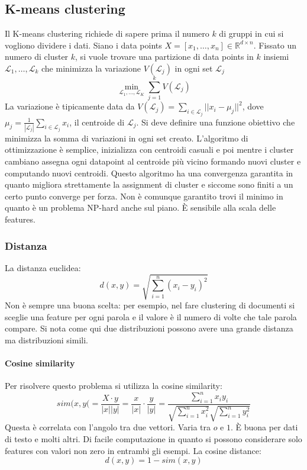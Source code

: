 	\subsection{K-means clustering}
	Il K-means clustering richiede di sapere prima il numero $k$ di gruppi in cui si vogliono dividere i dati.
	Siano i data points $X=[x_1,\dots,x_n]\in\mathbb{R}^{d\times n}$.
	Fissato un numero di cluster $k$, si vuole trovare una partizione di data points in $k$ insiemi $\mathcal{L}_1,\dots,\mathcal{L}_k$ che minimizza la variazione $V(\mathcal{L}_j)$ in ogni set $\mathcal{L}_j$
	$$\min\limits_{\mathcal{L}_1,\dots,\mathcal{L}_K}\sum\limits_{j = 1}^kV(\mathcal{L}_j)$$
	La variazione \`e tipicamente data da $V(\mathcal{L}_j) = \sum\limits_{i\in\mathcal{L}_j}||x_i-\mu_j||^2$, dove $\mu_j = \frac{1}{|\mathcal{L}_j|}\sum\limits_{i\in\mathcal{L}_j}x_i$, il centroide di $\mathcal{L}_j$.
	Si deve definire una funzione obiettivo che minimizza la somma di variazioni in ogni set creato.
	L'algoritmo di ottimizzazione \`e semplice, inizializza con centroidi casuali e poi mentre i cluster cambiano assegna ogni datapoint al centroide pi\`u vicino formando nuovi cluster e computando nuovi centroidi.
	Questo algoritmo ha una convergenza garantita in quanto migliora strettamente la assignment di cluster e siccome sono finiti a un certo punto converge per forza.
	Non \`e comunque garantito trovi il minimo in quanto \`e un problema NP-hard anche sul piano.
	\`E sensibile alla scala delle features.

		\subsubsection{Distanza}
		La distanza euclidea:
		$$d(x,y) = \sqrt{\sum\limits_{i=1}^n(x_i-y_i)^2}$$
		Non \`e sempre una buona scelta: per esempio, nel fare clustering di documenti si sceglie una feature per ogni parola e il valore \`e il numero di volte che tale parola compare.
		Si nota come qui due distribuzioni possono avere una grande distanza ma distribuzioni simili.

			\paragraph{Cosine similarity}
			Per risolvere questo problema si utilizza la cosine similarity:
			$$sim(x,y( = \frac{X\cdot y}{|x||y|} = \frac{x}{|x|}\cdot\frac{y}{|y|} = \frac{\sum\limits_{i = 1}^n x_iy_i}{\sqrt{\sum\limits_{i = 1}^n x_i^2}\sqrt{\sum\limits_{i = 1}^ny_i^2}}$$
			Questa \`e correlata con l'angolo tra due vettori.
			Varia tra $o$ e $1$.
			\`E buona per dati di testo e molti altri.
			Di facile computazione in quanto si possono considerare solo features con valori non zero in entrambi gli esempi.
			La cosine distance:
			$$d(x,y) = 1-sim(x,y)$$

